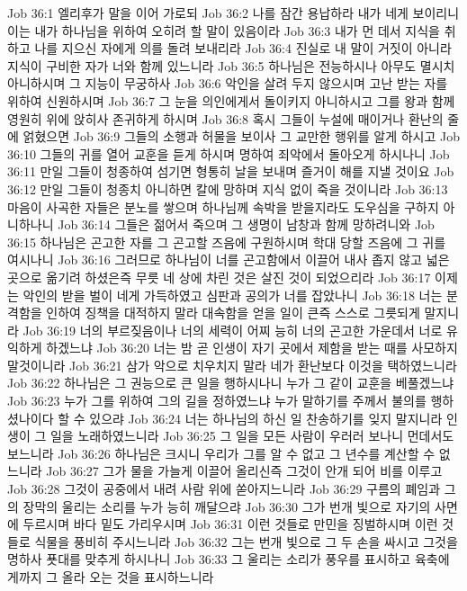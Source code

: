 Job 36:1  엘리후가 말을 이어 가로되
Job 36:2  나를 잠간 용납하라 내가 네게 보이리니 이는 내가 하나님을 위하여 오히려 할 말이 있음이라
Job 36:3  내가 먼 데서 지식을 취하고 나를 지으신 자에게 의를 돌려 보내리라
Job 36:4  진실로 내 말이 거짓이 아니라 지식이 구비한 자가 너와 함께 있느니라
Job 36:5  하나님은 전능하시나 아무도 멸시치 아니하시며 그 지능이 무궁하사
Job 36:6  악인을 살려 두지 않으시며 고난 받는 자를 위하여 신원하시며
Job 36:7  그 눈을 의인에게서 돌이키지 아니하시고 그를 왕과 함께 영원히 위에 앉히사 존귀하게 하시며
Job 36:8  혹시 그들이 누설에 매이거나 환난의 줄에 얽혔으면
Job 36:9  그들의 소행과 허물을 보이사 그 교만한 행위를 알게 하시고
Job 36:10  그들의 귀를 열어 교훈을 듣게 하시며 명하여 죄악에서 돌아오게 하시나니
Job 36:11  만일 그들이 청종하여 섬기면 형통히 날을 보내며 즐거이 해를 지낼 것이요
Job 36:12  만일 그들이 청종치 아니하면 칼에 망하며 지식 없이 죽을 것이니라
Job 36:13  마음이 사곡한 자들은 분노를 쌓으며 하나님께 속박을 받을지라도 도우심을 구하지 아니하나니
Job 36:14  그들은 젊어서 죽으며 그 생명이 남창과 함께 망하려니와
Job 36:15  하나님은 곤고한 자를 그 곤고할 즈음에 구원하시며 학대 당할 즈음에 그 귀를 여시나니
Job 36:16  그러므로 하나님이 너를 곤고함에서 이끌어 내사 좁지 않고 넓은곳으로 옮기려 하셨은즉 무릇 네 상에 차린 것은 살진 것이 되었으리라
Job 36:17  이제는 악인의 받을 벌이 네게 가득하였고 심판과 공의가 너를 잡았나니
Job 36:18  너는 분격함을 인하여 징책을 대적하지 말라 대속함을 얻을 일이 큰즉 스스로 그릇되게 말지니라
Job 36:19  너의 부르짖음이나 너의 세력이 어찌 능히 너의 곤고한 가운데서 너로 유익하게 하겠느냐
Job 36:20  너는 밤 곧 인생이 자기 곳에서 제함을 받는 때를 사모하지 말것이니라
Job 36:21  삼가 악으로 치우치지 말라 네가 환난보다 이것을 택하였느니라
Job 36:22  하나님은 그 권능으로 큰 일을 행하시나니 누가 그 같이 교훈을 베풀겠느냐
Job 36:23  누가 그를 위하여 그의 길을 정하였느냐 누가 말하기를 주께서 불의를 행하셨나이다 할 수 있으랴
Job 36:24  너는 하나님의 하신 일 찬송하기를 잊지 말지니라 인생이 그 일을 노래하였느니라
Job 36:25  그 일을 모든 사람이 우러러 보나니 먼데서도 보느니라
Job 36:26  하나님은 크시니 우리가 그를 알 수 없고 그 년수를 계산할 수 없느니라
Job 36:27  그가 물을 가늘게 이끌어 올리신즉 그것이 안개 되어 비를 이루고
Job 36:28  그것이 공중에서 내려 사람 위에 쏟아지느니라
Job 36:29  구름의 폐임과 그의 장막의 울리는 소리를 누가 능히 깨달으랴
Job 36:30  그가 번개 빛으로 자기의 사면에 두르시며 바다 밑도 가리우시며
Job 36:31  이런 것들로 만민을 징벌하시며 이런 것들로 식물을 풍비히 주시느니라
Job 36:32  그는 번개 빛으로 그 두 손을 싸시고 그것을 명하사 푯대를 맞추게 하시나니
Job 36:33  그 울리는 소리가 풍우를 표시하고 육축에게까지 그 올라 오는 것을 표시하느니라
